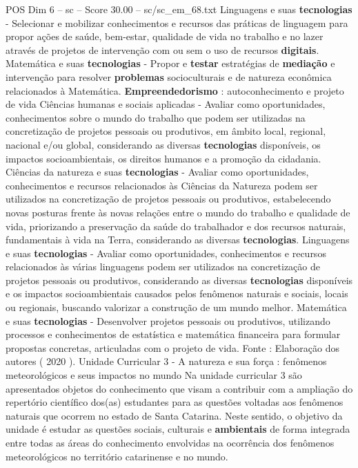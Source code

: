 \begin{textsample}{POS Dim 6 – sc – Score 30.00 – sc/sc\_em\_68.txt}
Linguagens e suas \textbf{tecnologias} - Selecionar e mobilizar conhecimentos e recursos das práticas de linguagem para propor ações de saúde, bem-estar, qualidade de vida no trabalho e no lazer através de projetos de intervenção com ou sem o uso de recursos \textbf{digitais}.
Matemática e suas \textbf{tecnologias} - Propor e \textbf{testar} estratégias de \textbf{mediação} e intervenção para resolver \textbf{problemas} socioculturais e de natureza econômica relacionados à Matemática. \textbf{Empreendedorismo} : autoconhecimento e projeto de vida Ciências humanas e sociais aplicadas - Avaliar como oportunidades, conhecimentos sobre o mundo do trabalho que podem ser utilizadas na concretização de projetos pessoais ou produtivos, em âmbito local, regional, nacional e/ou global, considerando as diversas \textbf{tecnologias} disponíveis, os impactos socioambientais, os direitos humanos e a promoção da cidadania.
Ciências da natureza e suas \textbf{tecnologias} - Avaliar como oportunidades, conhecimentos e recursos relacionados às Ciências da Natureza podem ser utilizados na concretização de projetos pessoais ou produtivos, estabelecendo novas posturas frente às novas relações entre o mundo do trabalho e qualidade de vida, priorizando a preservação da saúde do trabalhador e dos recursos naturais, fundamentais à vida na Terra, considerando as diversas \textbf{tecnologias}.
Linguagens e suas \textbf{tecnologias} - Avaliar como oportunidades, conhecimentos e recursos relacionados às várias linguagens podem ser utilizados na concretização de projetos pessoais ou produtivos, considerando as diversas \textbf{tecnologias} disponíveis e os impactos socioambientais causados pelos fenômenos naturais e sociais, locais ou regionais, buscando valorizar a construção de um mundo melhor.
Matemática e suas \textbf{tecnologias} - Desenvolver projetos pessoais ou produtivos, utilizando processos e conhecimentos de estatística e matemática financeira para formular propostas concretas, articuladas com o projeto de vida.
Fonte : Elaboração dos autores ( 2020 ).
Unidade Curricular 3 - A natureza e sua força : fenômenos meteorológicos e seus impactos no mundo Na unidade curricular 3 são apresentados objetos do conhecimento que visam a contribuir com a ampliação do repertório científico dos(as) estudantes para as questões voltadas aos fenômenos naturais que ocorrem no estado de Santa Catarina.
Neste sentido, o objetivo da unidade é estudar as questões sociais, culturais e \textbf{ambientais} de forma integrada entre todas as áreas do conhecimento envolvidas na ocorrência dos fenômenos meteorológicos no território catarinense e no mundo.

\end{textsample}
